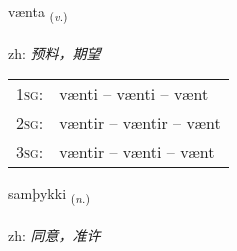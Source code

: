 \documentclass[frontgrid, backgrid]{flacards}\usepackage[]{graphicx}\usepackage[]{color}
\begin{document}
\renewcommand{\flhead}{\vskip5pt \fboxsep=0pt {\small\bfseries\footnotesize Sagnorð | 动词}}
\renewcommand{\fcfoot}{\vskip5pt \fboxsep=0pt \hspace{2pt}{\small\bfseries\footnotesize 2K}}

\renewcommand{\blhead}{\vskip5pt {\small\bfseries\footnotesize Sagnorð | 动词 }}
\renewcommand{\bcfoot}{\vskip5pt \hspace{2pt}{\small\bfseries\footnotesize 2K}}


{vænta \small{\textsubscript{(\textit{v.})}} \\[1ex] %
\textphonetic{[vain̥ta]} \\
zh: \emph{预料，期望} \\  [2ex]
\renewcommand*{\arraystretch}{0.8}
\begin{tabular}{p{1cm}l}
\textsc{1sg}: & vænti -- vænti -- vænt \\ 
\textsc{2sg}: & væntir -- væntir -- vænt \\ 
\textsc{3sg}: & væntir -- vænti -- vænt \\ 
\end{tabular}
}

\renewcommand{\flhead}{\vskip5pt \fboxsep=0pt {\small\bfseries\footnotesize Nafnorð | 名词}}
\renewcommand{\fcfoot}{\vskip5pt \fboxsep=0pt \hspace{2pt}{\small\bfseries\footnotesize 2K}}

\renewcommand{\blhead}{\vskip5pt {\small\bfseries\footnotesize Nafnorð | 名词 }}
\renewcommand{\bcfoot}{\vskip5pt \hspace{2pt}{\small\bfseries\footnotesize 2K}}


{samþykki \small{\textsubscript{(\textit{n.})}} \\[1ex] %
\textphonetic{[samθɪhcɪ]} \\
zh: \emph{同意，准许} \\  [2ex]
\renewcommand*{\arraystretch}{0.8}
}
\end{document}
